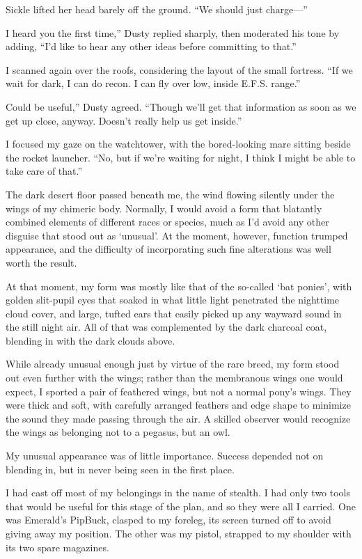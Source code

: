 Sickle lifted her head barely off the ground. “We should just charge—”

\leavevmode{}I heard you the first time,” Dusty replied sharply, then moderated his tone by adding, “I’d like to hear any other ideas before committing to that.”

I scanned again over the roofs, considering the layout of the small fortress. “If we wait for dark, I can do recon. I can fly over low, inside E.F.S. range.”

\leavevmode{}Could be useful,” Dusty agreed. “Though we’ll get that information as soon as we get up close, anyway. Doesn’t really help us get inside.”

I focused my gaze on the watchtower, with the bored-looking mare sitting beside the rocket launcher. “No, but if we’re waiting for night, I think I might be able to take care of that.”

{\br}%
The dark desert floor passed beneath me, the wind flowing silently under the wings of my chimeric body. Normally, I would avoid a form that blatantly combined elements of different races or species, much as I’d avoid any other disguise that stood out as ‘unusual’. At the moment, however, function trumped appearance, and the difficulty of incorporating such fine alterations was well worth the result.

At that moment, my form was mostly like that of the so-called ‘bat ponies’, with golden slit-pupil eyes that soaked in what little light penetrated the nighttime cloud cover, and large, tufted ears that easily picked up any wayward sound in the still night air. All of that was complemented by the dark charcoal coat, blending in with the dark clouds above.

While already unusual enough just by virtue of the rare breed, my form stood out even further with the wings; rather than the membranous wings one would expect, I sported a pair of feathered wings, but not a normal pony’s wings. They were thick and soft, with carefully arranged feathers and edge shape to minimize the sound they made passing through the air. A skilled observer would recognize the wings as belonging not to a pegasus, but an owl.

My unusual appearance was of little importance. Success depended not on blending in, but in never being seen in the first place.

I had cast off most of my belongings in the name of stealth. I had only two tools that would be useful for this stage of the plan, and so they were all I carried. One was Emerald’s PipBuck, clasped to my foreleg, its screen turned off to avoid giving away my position. The other was my pistol, strapped to my shoulder with its two spare magazines.

